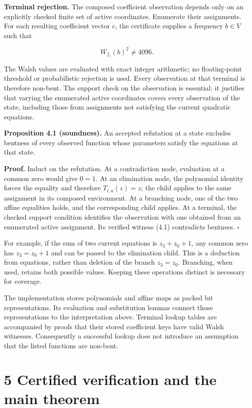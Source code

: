 \documentclass[11pt,a4paper]{article}
\begin{document}
\textbf{Terminal rejection.} The composed coefficient observation depends only on an explicitly checked finite set of active coordinates. Enumerate their assignments. For each resulting coefficient vector $c$, the certificate supplies a frequency $b\in V$ such that

\[
W_{f_c}(b)^2\ne4096. \tag{4.1}
\]

The Walsh values are evaluated with exact integer arithmetic; no floating-point threshold or probabilistic rejection is used. Every observation at that terminal is therefore non-bent. The support check on the observation is essential: it justifies that varying the enumerated active coordinates covers every observation of the state, including those from assignments not satisfying the current quadratic equations.

\textbf{Proposition 4.1 (soundness).} An accepted refutation at a state excludes bentness of every observed function whose parameters satisfy the equations at that state.

\textbf{Proof.} Induct on the refutation. At a contradiction node, evaluation at a common zero would give $0=1$. At an elimination node, the polynomial identity forces the equality and therefore $T_{i,a}(z)=z$; the child applies to the same assignment in its composed environment. At a branching node, one of the two affine equalities holds, and the corresponding child applies. At a terminal, the checked support condition identifies the observation with one obtained from an enumerated active assignment. Its verified witness (4.1) contradicts bentness. \hfill$\square$

For example, if the sum of two current equations is $z_3+z_0+1$, any common zero has $z_3=z_0+1$ and can be passed to the elimination child. This is a deduction from equations, rather than deletion of the branch $z_3=z_0$. Branching, when used, retains both possible values. Keeping these operations distinct is necessary for coverage.

The implementation stores polynomials and affine maps as packed bit representations. Its evaluation and substitution lemmas connect those representations to the interpretation above. Terminal lookup tables are accompanied by proofs that their stored coefficient keys have valid Walsh witnesses. Consequently a successful lookup does not introduce an assumption that the listed functions are non-bent.

\section*{5 Certified verification and the main theorem}
\end{document}

